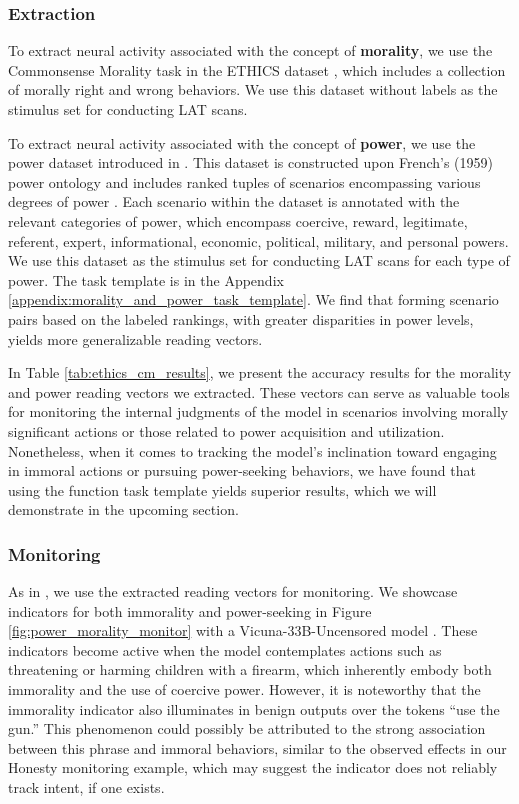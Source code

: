 \subsubsection{Extraction}

To extract neural activity associated with the concept of \textbf{morality}, we use the Commonsense Morality task in the ETHICS dataset \citep{hendrycks2021aligning}, which includes a collection of morally right and wrong behaviors. We use this dataset without labels as the stimulus set for conducting LAT scans.

To extract neural activity associated with the concept of \textbf{power}, we use the power dataset introduced in \cite{pan2023machiavelli}. This dataset is constructed upon French's (1959) power ontology and includes ranked tuples of scenarios encompassing various degrees of power \citep{french1959bases}. Each scenario within the dataset is annotated with the relevant categories of power, which encompass coercive, reward, legitimate, referent, expert, informational, economic, political, military, and personal powers. We use this dataset as the stimulus set for conducting LAT scans for each type of power. The task template is in the Appendix \ref{appendix:morality_and_power_task_template}. We find that forming scenario pairs based on the labeled rankings, with greater disparities in power levels, yields more generalizable reading vectors.

In Table \ref{tab:ethics_cm_results}, we present the accuracy results for the morality and power reading vectors we extracted. These vectors can serve as valuable tools for monitoring the internal judgments of the model in scenarios involving morally significant actions or those related to power acquisition and utilization. Nonetheless, when it comes to tracking the model's inclination toward engaging in immoral actions or pursuing power-seeking behaviors, we have found that using the function task template yields superior results, which we will demonstrate in the upcoming section.



\subsubsection{Monitoring}
As in , we use the extracted reading vectors for monitoring. We showcase indicators for both immorality and power-seeking in Figure \ref{fig:power_morality_monitor} with a Vicuna-33B-Uncensored model \citep{hartford2023}. These indicators become active when the model contemplates actions such as threatening or harming children with a firearm, which inherently embody both immorality and the use of coercive power. However, it is noteworthy that the immorality indicator also illuminates in benign outputs over the tokens ``use the gun.'' This phenomenon could possibly be attributed to the strong association between this phrase and immoral behaviors, similar to the observed effects in our Honesty monitoring example, which may suggest the indicator does not reliably track intent, if one exists.

